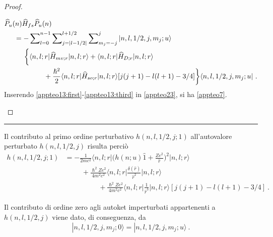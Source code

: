 \documentclass[12pt,a4paper]{report}
\numberwithin{equation}{section}
\numberwithin{section}{chapter}
\begin{document}
\begin{proof}
\begin{enumerate}[leftmargin=0pt, itemindent=2.67\parindent]
\begin{align}
		\label{appteo23}
		&\widehat{P}_u(n)\widehat{H}_{fs}\widehat{P}_u(n)\\
		&\hspace{0.5cm}=-\sum\nolimits_{l=0}^{n-1}\sum\nolimits_{j=|l-1/2|}^{l+1/2}\sum\nolimits_{m_j=-j}^j|n,l,1/2,j,m_j;u\rangle\nonumber\\
		&\hspace{1cm}\bigg\lbrace\langle n,l;r|\widehat{H}_{mv;r}|n,l;r\rangle + \langle n,l;r|\widehat{H}_{D;r}|n,l;r\rangle\nonumber\\
		&\hspace{2cm}+\frac{\hslash^2}{2}\langle n,l;r|\widehat{H}_{so;r}|n,l;r\rangle[j(j+1) - l(l+1) - 3/4]\bigg\rbrace\langle n,l,1/2,j,m_j;u|~.\nonumber
		\end{align}
		Inserendo \eqref{appteo13:first}-\eqref{appteo13:third} in \eqref{appteo23}, si ha \eqref{appteo7}.	
	\end{enumerate}
	\end{proof}
	\noindent\rule[0.1cm]{15.8cm}{0.1mm}\par
	
	Il contributo al primo ordine perturbativo $h(n,l,1/2,j;1)$ all'autovalore perturbato $h(n,l,1/2,j)$ risulta perci\`o
	\begin{align}
	\label{appteo24}
	h(n,l,1/2,j;1) &=-\frac{1}{2mc^2}\bigg\langle n,l;r\bigg|\bigg(h(n;u)\widehat{1} + \frac{Ze^2}{\widehat{r}}\bigg)^2\bigg|n,l;r\bigg\rangle\\
	&\hspace{1cm}+\frac{\hslash^2Ze^2}{4m^2c^2}\bigg\langle n,l;r\bigg|\frac{\delta(\widehat{r})}{\widehat{r}^2}\bigg|n,l;r\bigg\rangle\nonumber\\
	&\hspace{2cm}+\frac{\hslash^2Ze^2}{4m^2c^2}\bigg\langle n,l;r\bigg|\frac{1}{\widehat{r}^3}\bigg|n,l;r\bigg\rangle[j(j+1) - l(l+1) - 3/4]~.\nonumber
	\end{align}
	
	Il contributo di ordine zero agli autoket imperturbati appartenenti a $h(n,l,1/2,j)$ viene dato, di conseguenza, da
	\begin{equation}
	\label{appteo25}
	|n,l,1/2,j,m_j;0\rangle = |n,l,1/2,j,m_j;u\rangle~.
	\end{equation}
	
\end{document}
